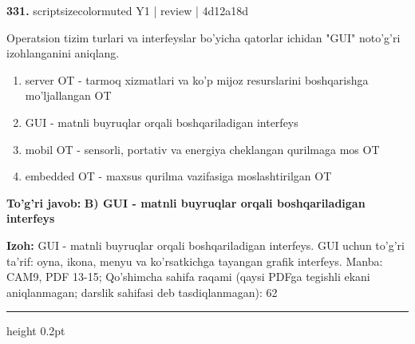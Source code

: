 \documentclass[10pt,a4paper]{article}
\begin{document}
{\bfseries\sffamily\color{ink} 331.} {scriptsizecolor{muted} Y1 | review | 4d12a18d}
\par
Operatsion tizim turlari va interfeyslar bo'yicha qatorlar ichidan "GUI" noto'g'ri izohlanganini aniqlang.
\begin{enumerate}[label=\Alph*),leftmargin=9mm]
\item server OT - tarmoq xizmatlari va ko'p mijoz resurslarini boshqarishga mo'ljallangan OT
\item GUI - matnli buyruqlar orqali boshqariladigan interfeys
\item mobil OT - sensorli, portativ va energiya cheklangan qurilmaga mos OT
\item embedded OT - maxsus qurilma vazifasiga moslashtirilgan OT
\end{enumerate}
\begin{tcolorbox}[enhanced,breakable,colback=teal!4,colframe=teal!60!black,boxrule=0.45pt,arc=1.2mm,left=2.7mm,right=2.7mm,top=1.8mm,bottom=1.8mm,before skip=2mm,after skip=2mm]
{\bfseries\sffamily\color{teal}To'g'ri javob:} \textbf{B) GUI - matnli buyruqlar orqali boshqariladigan interfeys}
\par\smallskip
{\bfseries Izoh:} GUI - matnli buyruqlar orqali boshqariladigan interfeys. GUI uchun to'g'ri ta'rif: oyna, ikona, menyu va ko'rsatkichga tayangan grafik interfeys. Manba: CAM9, PDF 13-15; Qo'shimcha sahifa raqami (qaysi PDFga tegishli ekani aniqlanmagan; darslik sahifasi deb tasdiqlanmagan): 62
\end{tcolorbox}
\vspace{2mm}\hrule height 0.2pt\vspace{3mm}
\end{document}
